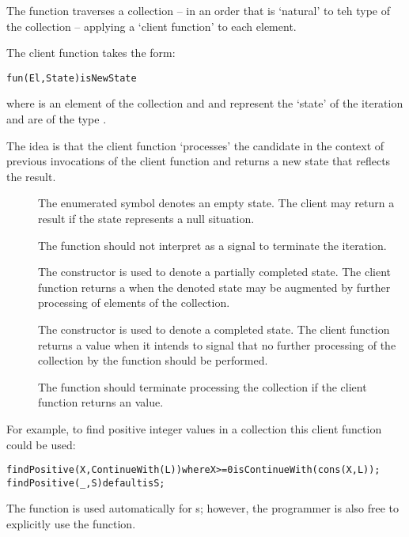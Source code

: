 The  function traverses a collection -- in an order that is `natural' to teh type of the collection -- applying a `client function' to each element.

The client function takes the form:
\begin{alltt}
fun(El,State) is NewState
\end{alltt}
where  is an element of the collection and  and  represent the `state' of the iteration and are of the type .

\begin{aside}
The idea is that the client function `processes' the candidate in the context of previous invocations of the client function and returns a new state that reflects the result.
\end{aside}

\begin{description}
\item[] The  enumerated symbol denotes an empty state. The client may return a  result if the state represents a null situation.

\begin{aside}
The  function should not interpret  as a signal to terminate the iteration.
\end{aside}
\item[]
The  constructor is used to denote a partially completed state. The client function returns a  when the denoted state may be augmented by further processing of elements of the collection.
\item[]
The  constructor is used to denote a completed state. The client function returns a  value when it intends to signal that no further processing of the collection by the  function should be performed.

The  function should terminate processing the collection if the client function returns an  value.
\end{description}

For example, to find positive integer values in a collection this client function could be used:
\begin{alltt}
findPositive(X, ContinueWith(L)) where X>=0 is ContinueWith(cons(X,L));
findPositive(_,S) default is S;
\end{alltt}
\begin{aside}
The  function is used automatically for s; however, the programmer is also free to explicitly use the  function.
\end{aside}
 
